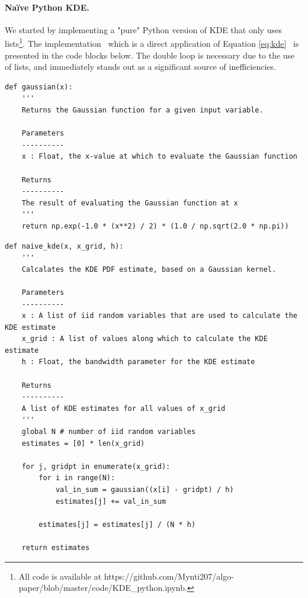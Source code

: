 \documentclass[11pt]{article}
\begin{document}
\paragraph{Na\"ive Python KDE.} We started by implementing a "pure" Python version of KDE that only uses lists\footnote{All code is available at https://github.com/Mynti207/algo-paper/blob/master/code/KDE\_python.ipynb.}.  The implementation \textendash \ which is a direct application of Equation \ref{eq:kde} \textendash \ is presented in the code blocks below. The double loop is necessary due to the use of lists, and immediately stands out as a significant source of inefficiencies.

\begin{framed}
\begin{singlespacing}
\begin{scriptsize}
\begin{verbatim}
def gaussian(x):
    '''
    Returns the Gaussian function for a given input variable.
    
    Parameters
    ----------
    x : Float, the x-value at which to evaluate the Gaussian function
        
    Returns
    ----------
    The result of evaluating the Gaussian function at x
    '''
    return np.exp(-1.0 * (x**2) / 2) * (1.0 / np.sqrt(2.0 * np.pi))
\end{verbatim}
\end{scriptsize}
\end{singlespacing}
\end{framed}

\newpage

\begin{framed}
\begin{singlespacing}
\begin{scriptsize}
\begin{verbatim}
def naive_kde(x, x_grid, h):
    '''
    Calcalates the KDE PDF estimate, based on a Gaussian kernel.
    
    Parameters
    ----------
    x : A list of iid random variables that are used to calculate the KDE estimate
    x_grid : A list of values along which to calculate the KDE estimate
    h : Float, the bandwidth parameter for the KDE estimate
        
    Returns
    ----------
    A list of KDE estimates for all values of x_grid
    '''
    global N # number of iid random variables
    estimates = [0] * len(x_grid)
    
    for j, gridpt in enumerate(x_grid):
        for i in range(N):
            val_in_sum = gaussian((x[i] - gridpt) / h)
            estimates[j] += val_in_sum
        
        estimates[j] = estimates[j] / (N * h)
    
    return estimates
\end{verbatim}
\end{scriptsize}
\end{singlespacing}
\end{framed}
\end{document}
